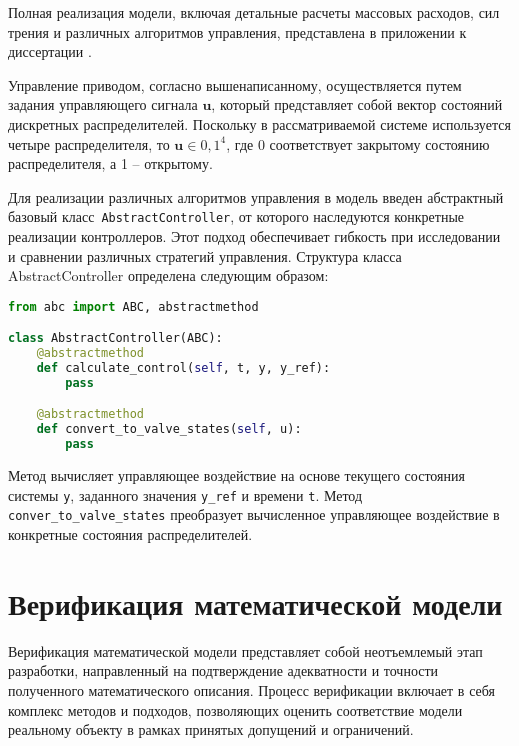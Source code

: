 Полная реализация модели, включая детальные расчеты массовых расходов, сил трения и
различных алгоритмов управления, представлена в приложении к диссертации .

Управление приводом, согласно вышенаписанному, осуществляется путем задания управляющего сигнала $\mathbf{u}$,
который представляет собой вектор состояний дискретных распределителей. Поскольку в рассматриваемой системе используется четыре распределителя, то $\mathbf{u} \in {0,1}^4$, где 0 соответствует
закрытому состоянию распределителя, а 1 -- открытому.

Для реализации различных алгоритмов управления в модель введен абстрактный базовый класс~\texttt{AbstractController},
от которого наследуются конкретные реализации контроллеров. Этот подход обеспечивает гибкость при исследовании
и сравнении различных стратегий управления. Структура класса AbstractController определена следующим образом:

\begin{ListingEnv}[!h]%
    \captiondelim{ } %
    \caption{ \protect\python}\label{lst:AbstractControllerClass}
    \begin{lstlisting}[language={Python}]
from abc import ABC, abstractmethod

class AbstractController(ABC):
    @abstractmethod
    def calculate_control(self, t, y, y_ref):
        pass

    @abstractmethod
    def convert_to_valve_states(self, u):
        pass
    \end{lstlisting}
\end{ListingEnv}%

Метод  вычисляет управляющее воздействие на основе текущего состояния системы \texttt{y},
заданного значения \texttt{y\_ref} и времени \texttt{t}.
Метод \texttt{conver\_to\_valve\_states} преобразует вычисленное управляющее воздействие
в конкретные состояния распределителей.

\section{Верификация математической модели}\label{sec:ch2/sec7}
Верификация математической модели  представляет собой неотъемлемый этап разработки, направленный на подтверждение адекватности
и точности полученного математического описания. Процесс верификации включает в себя комплекс методов и подходов,
позволяющих оценить соответствие модели реальному объекту в рамках принятых допущений и ограничений.

